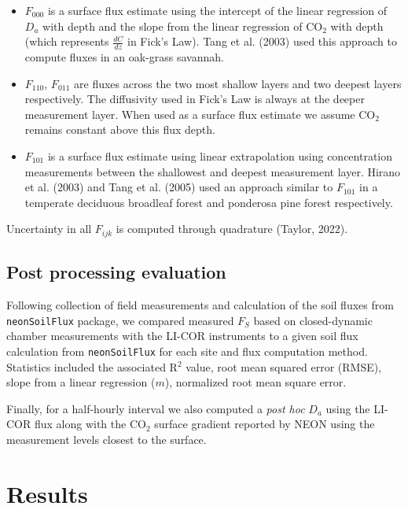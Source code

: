 \documentclass[
  letterpaper,
  DIV=11,
  numbers=noendperiod]{scrartcl}
\providecommand{\tightlist}{%
  \setlength{\itemsep}{0pt}\setlength{\parskip}{0pt}}\usepackage{longtable,booktabs,array}
\begin{document}
\begin{itemize}
\tightlist
\item
  \(F_{000}\) is a surface flux estimate using the intercept of the
  linear regression of \(D_{a}\) with depth and the slope from the
  linear regression of CO\(_{2}\) with depth (which represents
  \(\displaystyle \frac{dC}{dz}\) in Fick's Law). Tang et al. (2003)
  used this approach to compute fluxes in an oak-grass savannah.
\item
  \(F_{110}\), \(F_{011}\) are fluxes across the two most shallow layers
  and two deepest layers respectively. The diffusivity used in Fick's
  Law is always at the deeper measurement layer. When used as a surface
  flux estimate we assume CO\(_{2}\) remains constant above this flux
  depth.
\item
  \(F_{101}\) is a surface flux estimate using linear extrapolation
  using concentration measurements between the shallowest and deepest
  measurement layer. Hirano et al. (2003) and Tang et al. (2005) used an
  approach similar to \(F_{101}\) in a temperate deciduous broadleaf
  forest and ponderosa pine forest respectively.
\end{itemize}

Uncertainty in all \(F_{ijk}\) is computed through quadrature (Taylor,
2022).

\subsection{Post processing evaluation}\label{sec-post-process}

Following collection of field measurements and calculation of the soil
fluxes from \texttt{neonSoilFlux} package, we compared measured
\(F_{S}\) based on closed-dynamic chamber measurements with the LI-COR
instruments to a given soil flux calculation from \texttt{neonSoilFlux}
for each site and flux computation method. Statistics included the
associated R\(^{2}\) value, root mean squared error (RMSE), slope from a
linear regression (\(m\)), normalized root mean square error.

Finally, for a half-hourly interval we also computed a \emph{post hoc}
\(D_{a}\) using the LI-COR flux along with the CO\(_{2}\) surface
gradient reported by NEON using the measurement levels closest to the
surface.

\section{Results}\label{results}
\end{document}
